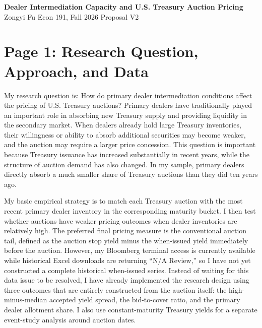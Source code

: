\documentclass[12pt]{article}
\begin{document}
\begin{center}
{\large\bfseries Dealer Intermediation Capacity and U.S. Treasury Auction Pricing}\\[0.3em]
{\normalsize Zongyi Fu \quad\textbar\quad Econ 191, Fall 2026 \quad\textbar\quad Proposal V2}
\end{center}

\vspace{0.6em}

\section{Page 1: Research Question, Approach, and Data}

My research question is: How do primary dealer intermediation conditions affect the pricing of U.S. Treasury auctions? Primary dealers have traditionally played an important role in absorbing new Treasury supply and providing liquidity in the secondary market. When dealers already hold large Treasury inventories, their willingness or ability to absorb additional securities may become weaker, and the auction may require a larger price concession. This question is important because Treasury issuance has increased substantially in recent years, while the structure of auction demand has also changed. In my sample, primary dealers directly absorb a much smaller share of Treasury auctions than they did ten years ago.

My basic empirical strategy is to match each Treasury auction with the most recent primary dealer inventory in the corresponding maturity bucket. I then test whether auctions have weaker pricing outcomes when dealer inventories are relatively high. The preferred final pricing measure is the conventional auction tail, defined as the auction stop yield minus the when-issued yield immediately before the auction. However, my Bloomberg terminal access is currently available while historical Excel downloads are returning ``N/A Review,'' so I have not yet constructed a complete historical when-issued series. Instead of waiting for this data issue to be resolved, I have already implemented the research design using three outcomes that are entirely constructed from the auction itself: the high-minus-median accepted yield spread, the bid-to-cover ratio, and the primary dealer allotment share. I also use constant-maturity Treasury yields for a separate event-study analysis around auction dates.
\end{document}
